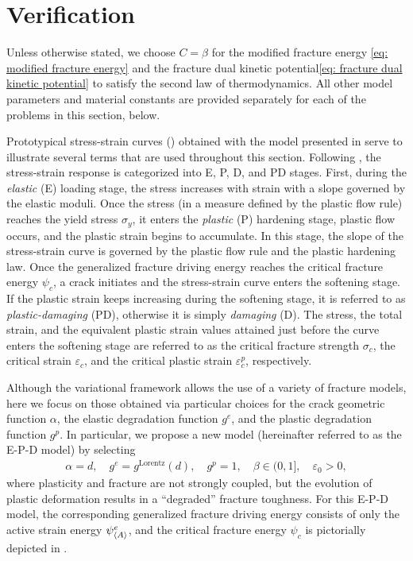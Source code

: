 \section{Verification}
\label{section: Chapter5/verification}

Unless otherwise stated, we choose $C = \beta$ for the modified fracture energy \eqref{eq: modified fracture energy} and the fracture dual kinetic potential\eqref{eq: fracture dual kinetic potential} to satisfy the second law of thermodynamics. All other model parameters and material constants are provided separately for each of the problems in this section, below.



Prototypical stress-strain curves () obtained with the model presented in  serve to illustrate several terms that are used throughout this section. Following \cite{alessi_coupling_2018}, the stress-strain response is categorized into \textrm{E}, \textrm{P}, \textrm{D}, and \textrm{PD} stages. First, during the \emph{elastic} (\textrm{E}) loading stage, the stress increases with strain with a slope governed by the elastic moduli. Once the stress (in a measure defined by the plastic flow rule) reaches the yield stress $\sigma_y$, it enters the \emph{plastic} (\textrm{P}) hardening stage, plastic flow occurs, and the plastic strain begins to accumulate. In this stage, the slope of the stress-strain curve is governed by the plastic flow rule and the plastic hardening law.
Once the generalized fracture driving energy reaches the critical fracture energy $\psi_c$, a crack initiates and the stress-strain curve enters the softening stage. If the plastic strain keeps increasing during the softening stage, it is referred to as \emph{plastic-damaging} (\textrm{PD}), otherwise it is simply \emph{damaging} (\textrm{D}). The stress, the total strain, and the equivalent plastic strain values attained just before the curve enters the softening stage are referred to as the critical fracture strength $\sigma_c$, the critical strain $\varepsilon_c$, and the critical plastic strain $\varepsilon^p_c$, respectively.

Although the variational framework allows the use of a variety of fracture models, here we focus on those obtained via particular choices for the crack geometric function $\alpha$, the elastic degradation function $g^e$, and the plastic degradation function $g^p$. In particular, we propose a new model (hereinafter referred to as the E-P-D model) by selecting
\begin{align*}
  \alpha = d, \quad g^e = g^\text{Lorentz}(d), \quad g^p = 1, \quad \beta \in (0,1], \quad \varepsilon_0 > 0,
\end{align*}
where plasticity and fracture are not strongly coupled, but the evolution of plastic deformation results in a ``degraded'' fracture toughness. For this E-P-D model, the corresponding generalized fracture driving energy consists of only the active strain energy $\psi^e_{\left< A \right>}$, and the critical fracture energy $\psi_c$ is pictorially depicted in .

